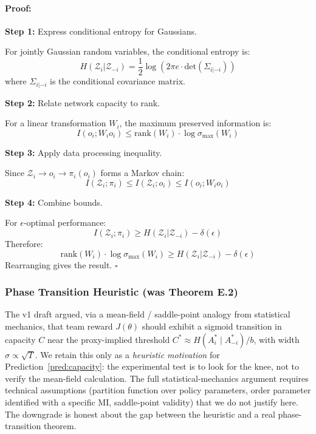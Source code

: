 \documentclass[10pt, letterpaper]{article}
\begin{document}
\paragraph{Proof:}

\textbf{Step 1:} Express conditional entropy for Gaussians.

For jointly Gaussian random variables, the conditional entropy is:
\[H(\mathcal{Z}_i | \mathcal{Z}_{-i}) = \frac{1}{2} \log(2\pi e \cdot \text{det}(\Sigma_{i|-i}))\]
where $\Sigma_{i|-i}$ is the conditional covariance matrix.

\textbf{Step 2:} Relate network capacity to rank.

For a linear transformation $W_i$, the maximum preserved information is:
\[I(o_i; W_i o_i) \leq \text{rank}(W_i) \cdot \log \sigma_{\max}(W_i)\]

\textbf{Step 3:} Apply data processing inequality.

Since $\mathcal{Z}_i \to o_i \to \pi_i(o_i)$ forms a Markov chain:
\[I(\mathcal{Z}_i; \pi_i) \leq I(\mathcal{Z}_i; o_i) \leq I(o_i; W_i o_i)\]

\textbf{Step 4:} Combine bounds.

For $\epsilon$-optimal performance:
\[I(\mathcal{Z}_i; \pi_i) \geq H(\mathcal{Z}_i | \mathcal{Z}_{-i}) - \delta(\epsilon)\]
Therefore:
\[\text{rank}(W_i) \cdot \log \sigma_{\max}(W_i) \geq H(\mathcal{Z}_i | \mathcal{Z}_{-i}) - \delta(\epsilon)\]
Rearranging gives the result. $\square$

\subsubsection{Phase Transition Heuristic (was Theorem E.2)}

The v1 draft argued, via a mean-field / saddle-point analogy from statistical mechanics, that team reward $J(\theta)$ should exhibit a sigmoid transition in capacity $C$ near the proxy-implied threshold $C^* \approx H(A_i^*\mid A_{-i}^*)/b$, with width $\sigma \propto \sqrt{T}$. We retain this only as a \emph{heuristic motivation} for Prediction~\ref{pred:capacity}: the experimental test is to look for the knee, not to verify the mean-field calculation. The full statistical-mechanics argument requires technical assumptions (partition function over policy parameters, order parameter identified with a specific MI, saddle-point validity) that we do not justify here. The downgrade is honest about the gap between the heuristic and a real phase-transition theorem.
\end{document}
